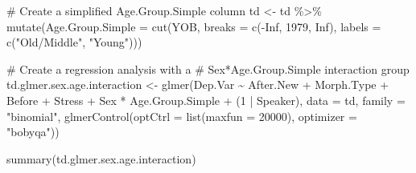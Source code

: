\documentclass[
  10pt,
  letterpaper]{article}
\newenvironment{Shaded}{\begin{snugshade}}{\end{snugshade}}
\newcommand{\AttributeTok}[1]{\textcolor[rgb]{0.40,0.45,0.13}{#1}}
\newcommand{\CommentTok}[1]{\textcolor[rgb]{0.37,0.37,0.37}{#1}}
\newcommand{\ConstantTok}[1]{\textcolor[rgb]{0.56,0.35,0.01}{#1}}
\newcommand{\DecValTok}[1]{\textcolor[rgb]{0.68,0.00,0.00}{#1}}
\newcommand{\FunctionTok}[1]{\textcolor[rgb]{0.28,0.35,0.67}{#1}}
\newcommand{\NormalTok}[1]{\textcolor[rgb]{0.00,0.23,0.31}{#1}}
\newcommand{\OtherTok}[1]{\textcolor[rgb]{0.00,0.23,0.31}{#1}}
\newcommand{\SpecialCharTok}[1]{\textcolor[rgb]{0.37,0.37,0.37}{#1}}
\newcommand{\StringTok}[1]{\textcolor[rgb]{0.13,0.47,0.30}{#1}}
\begin{document}
\begin{Shaded}
\begin{Highlighting}[]
\CommentTok{\# Create a simplified Age.Group.Simple column}
\NormalTok{td }\OtherTok{\textless{}{-}}\NormalTok{ td }\SpecialCharTok{\%\textgreater{}\%}
    \FunctionTok{mutate}\NormalTok{(}\AttributeTok{Age.Group.Simple =} \FunctionTok{cut}\NormalTok{(YOB, }\AttributeTok{breaks =} \FunctionTok{c}\NormalTok{(}\SpecialCharTok{{-}}\ConstantTok{Inf}\NormalTok{,}
        \DecValTok{1979}\NormalTok{, }\ConstantTok{Inf}\NormalTok{), }\AttributeTok{labels =} \FunctionTok{c}\NormalTok{(}\StringTok{"Old/Middle"}\NormalTok{, }\StringTok{"Young"}\NormalTok{)))}

\CommentTok{\# Create a regression analysis with a}
\CommentTok{\# Sex*Age.Group.Simple interaction group}
\NormalTok{td.glmer.sex.age.interaction }\OtherTok{\textless{}{-}} \FunctionTok{glmer}\NormalTok{(Dep.Var }\SpecialCharTok{\textasciitilde{}}\NormalTok{ After.New }\SpecialCharTok{+}
\NormalTok{    Morph.Type }\SpecialCharTok{+}\NormalTok{ Before }\SpecialCharTok{+}\NormalTok{ Stress }\SpecialCharTok{+}\NormalTok{ Sex }\SpecialCharTok{*}\NormalTok{ Age.Group.Simple }\SpecialCharTok{+}
\NormalTok{    (}\DecValTok{1} \SpecialCharTok{|}\NormalTok{ Speaker), }\AttributeTok{data =}\NormalTok{ td, }\AttributeTok{family =} \StringTok{"binomial"}\NormalTok{,}
    \FunctionTok{glmerControl}\NormalTok{(}\AttributeTok{optCtrl =} \FunctionTok{list}\NormalTok{(}\AttributeTok{maxfun =} \DecValTok{20000}\NormalTok{), }\AttributeTok{optimizer =} \StringTok{"bobyqa"}\NormalTok{))}

\FunctionTok{summary}\NormalTok{(td.glmer.sex.age.interaction)}
\end{Highlighting}
\end{Shaded}
\end{document}
